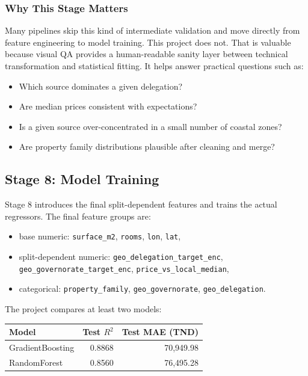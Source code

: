 \documentclass[11pt,a4paper]{article}
\newcommand{\code}[1]{\texttt{#1}}
\begin{document}
\subsubsection{Why This Stage Matters}

Many pipelines skip this kind of intermediate validation and move directly from feature engineering to model training. This project does not. That is valuable because visual QA provides a human-readable sanity layer between technical transformation and statistical fitting. It helps answer practical questions such as:

\begin{itemize}
\item Which source dominates a given delegation?
\item Are median prices consistent with expectations?
\item Is a given source over-concentrated in a small number of coastal zones?
\item Are property family distributions plausible after cleaning and merge? 
\end{itemize}

\subsection{Stage 8: Model Training}

Stage 8 introduces the final split-dependent features and trains the actual regressors. The final feature groups are:

\begin{itemize}
\item base numeric: \code{surface\_m2}, \code{rooms}, \code{lon}, \code{lat},
\item split-dependent numeric: \code{geo\_delegation\_target\_enc}, \code{geo\_governorate\_target\_enc}, \code{price\_vs\_local\_median},
\item categorical: \code{property\_family}, \code{geo\_governorate}, \code{geo\_delegation}.
\end{itemize}

The project compares at least two models:

\begin{center}
\begin{tabular}{lrr}
\toprule
Model & Test $R^2$ & Test MAE (TND) \\
\midrule
GradientBoosting & 0.8868 & 70,949.98 \\
RandomForest & 0.8560 & 76,495.28 \\
\bottomrule
\end{tabular}
\end{center}
\end{document}
